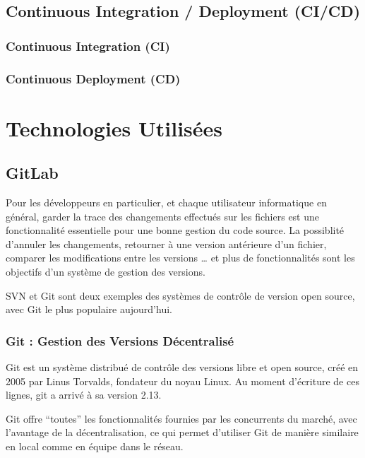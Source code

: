 \subsection{Continuous Integration / Deployment (CI/CD)}

\subsubsection{Continuous Integration (CI)}

\subsubsection{Continuous Deployment (CD)}

\section{Technologies Utilisées}

\subsection{GitLab} \label{gitlab}

Pour les développeurs en particulier, et chaque utilisateur informatique en général, garder la trace des changements effectués sur les fichiers est une fonctionnalité essentielle pour une bonne gestion du code source. La possiblité d’annuler les changements, retourner à une version antérieure d’un fichier, comparer les modifications entre les versions … et plus de fonctionnalités sont les objectifs d’un système de gestion des versions. 
\newline

SVN et Git sont deux exemples des systèmes de contrôle de version open source, avec Git le plus populaire aujourd'hui.

\subsubsection{Git : Gestion des Versions Décentralisé}
Git est un système distribué de contrôle des versions libre et open source, créé en 2005 par Linus Torvalds, fondateur du noyau Linux. Au moment d’écriture de ces lignes, git a arrivé à sa version 2.13. 
\newline

Git offre “toutes” les fonctionnalités fournies par les concurrents du marché, avec l’avantage de la décentralisation, ce qui permet d’utiliser Git de manière similaire en local comme en équipe dans le réseau.
\newline

